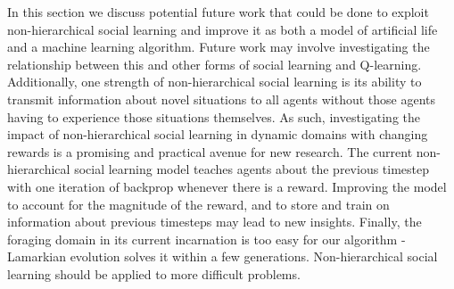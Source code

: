 \documentclass{acm_proc_article-sp}
\begin{document}
In this section we discuss potential future work that could be done to exploit non-hierarchical social learning and improve it as both a model of artificial life and a machine learning algorithm. Future work may involve investigating the relationship between this and other forms of social learning and Q-learning.  Additionally, one strength of non-hierarchical social learning is its ability to transmit information about novel situations to all agents without those agents having to experience those situations themselves.  As such, investigating the impact of non-hierarchical social learning in dynamic domains with changing rewards is a promising and practical avenue for new research.  The current non-hierarchical social learning model teaches agents about the previous timestep with one iteration of backprop whenever there is a reward.  Improving the model to account for the magnitude of the reward, and to store and train on information about previous timesteps may lead to new insights.  Finally, the foraging domain in its current incarnation is too easy for our algorithm - Lamarkian evolution solves it within a few generations. Non-hierarchical social learning should be applied to more difficult problems.
\end{document}
